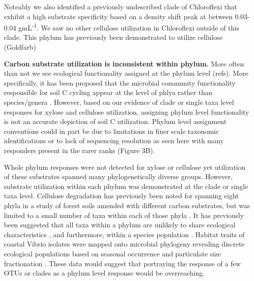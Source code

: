 Noteably we also identified a previously undescribed clade of Chloroflexi that exhibit a high substrate specificity based on a density shift peak at between 0.03-0.04 gmL\textsuperscript{-1}.  We saw no other cellulose utilization in Chloroflexi outside of this clade.  This phylum has previously been demonstrated to utilize cellulose (Goldfarb)  

\textbf{Carbon substrate utilization is inconsistent within phylum.} More often than not we see ecological functionality assigned at the phylum level (refs). More specifically, it has been proposed that the microbial community functionality responsible for soil C cycling appear at the level of phlya rather than species/genera \cite{Schimel_2012}. However, based on our evidence of clade or single taxa level responses for xylose and cellulose utilization, assigning phylum level functionality is not an accurate depiction of soil C utilization. Phylum level assignment conventions could in part be due to limitations in finer scale taxonomic identifications or to lack of sequencing resolution as seen here with many responders present in the rarer ranks (Figure 3B). 

Whole phylum responses were not detected for xylose or cellulose yet utilization of these substrates spanned many phylogenetically diverse groups. However, substrate utilization within each phylum was demonstrated at the clade or single taxa level. Cellulose degradation has previously been noted for spanning eight phyla in a study of forest soils amended with different carbon substrates, but was limited to a small number of taxa within each of those phyla \cite{Goldfarb_2011}. It has previously been suggested that all taxa within a phylum are unlikely to share ecological characteristics \cite{Fierer_2007}, and furthermore, within a species population \cite{Choudoir_2012}\cite{Preheim_2011}\cite{Hunt_2008}. Habitat traits of coastal Vibrio isolates were mapped onto microbial phylogeny revealing discrete ecological populations based on seasonal occurrence and particulate size fractionation \cite{Preheim_2011}\cite{Hunt_2008}. These data would suggest that portraying the response of a few OTUs or clades as a phylum level response would be overreaching.     

